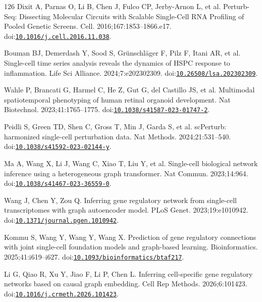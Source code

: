 \begin{thebibliography}{126}
Dixit A, Parnas O, Li B, Chen J, Fulco CP, Jerby-Arnon L, et al. Perturb-Seq: Dissecting Molecular Circuits with Scalable Single-Cell RNA Profiling of Pooled Genetic Screens. Cell. 2016;167:1853--1866.e17. doi:\href{https://doi.org/10.1016/j.cell.2016.11.038}{\nolinkurl{10.1016/j.cell.2016.11.038}}.

Bouman BJ, Demerdash Y, Sood S, Grünschläger F, Pilz F, Itani AR, et al. Single-cell time series analysis reveals the dynamics of HSPC response to inflammation. Life Sci Alliance. 2024;7:e202302309. doi:\href{https://doi.org/10.26508/lsa.202302309}{\nolinkurl{10.26508/lsa.202302309}}.

Wahle P, Brancati G, Harmel C, He Z, Gut G, del Castillo JS, et al. Multimodal spatiotemporal phenotyping of human retinal organoid development. Nat Biotechnol. 2023;41:1765--1775. doi:\href{https://doi.org/10.1038/s41587-023-01747-2}{\nolinkurl{10.1038/s41587-023-01747-2}}.

Peidli S, Green TD, Shen C, Gross T, Min J, Garda S, et al. scPerturb: harmonized single-cell perturbation data. Nat Methods. 2024;21:531--540. doi:\href{https://doi.org/10.1038/s41592-023-02144-y}{\nolinkurl{10.1038/s41592-023-02144-y}}.

Ma A, Wang X, Li J, Wang C, Xiao T, Liu Y, et al. Single-cell biological network inference using a heterogeneous graph transformer. Nat Commun. 2023;14:964. doi:\href{https://doi.org/10.1038/s41467-023-36559-0}{\nolinkurl{10.1038/s41467-023-36559-0}}.

Wang J, Chen Y, Zou Q. Inferring gene regulatory network from single-cell transcriptomes with graph autoencoder model. PLoS Genet. 2023;19:e1010942. doi:\href{https://doi.org/10.1371/journal.pgen.1010942}{\nolinkurl{10.1371/journal.pgen.1010942}}.

Kommu S, Wang Y, Wang Y, Wang X. Prediction of gene regulatory connections with joint single-cell foundation models and graph-based learning. Bioinformatics. 2025;41:i619--i627. doi:\href{https://doi.org/10.1093/bioinformatics/btaf217}{\nolinkurl{10.1093/bioinformatics/btaf217}}.

Li G, Qiao R, Xu Y, Jiao F, Li P, Chen L. Inferring cell-specific gene regulatory networks based on causal graph embedding. Cell Rep Methods. 2026;6:101423. doi:\href{https://doi.org/10.1016/j.crmeth.2026.101423}{\nolinkurl{10.1016/j.crmeth.2026.101423}}.


\end{thebibliography}
